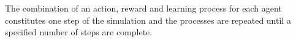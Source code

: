 The combination of an action, reward and learning process for each agent
constitutes one step of the simulation and the processes are repeated until a
specified number of steps are complete.

%
